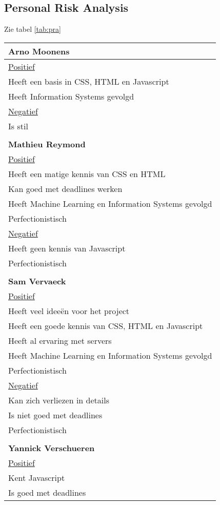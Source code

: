 \subsection{Personal Risk Analysis}
Zie tabel \ref{tab:pra}
\begin{longtable}{l}
\centering
 \textbf{Arno Moonens}  \\
 \hline
  \underline{Positief} \\ 
  Heeft een basis in CSS, HTML en Javascript \\
  Heeft Information Systems gevolgd \\
  \underline{Negatief} \\
  Is stil \\
\\
  \textbf{Mathieu Reymond} \\
  \hline
  \underline{Positief} \\
  Heeft een matige kennis van CSS en HTML \\
  Kan goed met deadlines werken \\
  Heeft Machine Learning en Information Systems gevolgd \\
  Perfectionistisch \\
  \underline{Negatief} \\
  Heeft geen kennis van Javascript \\
  Perfectionistisch \\
  \\
  \textbf{Sam Vervaeck} \\
  \hline 
  \underline{Positief} \\
  Heeft veel ideeën voor het project \\
  Heeft een goede kennis van CSS, HTML en Javascript \\
  Heeft al ervaring met servers \\
  Heeft Machine Learning en Information Systems gevolgd \\
  Perfectionistisch \\
  \underline{Negatief} \\
  Kan zich verliezen in details \\
  Is niet goed met deadlines \\
  Perfectionistisch \\  
   \\
  \textbf{Yannick Verschueren} \\
  \hline
  \underline{Positief} \\
  Kent Javascript \\
  Is goed met deadlines \\

\end{longtable}
